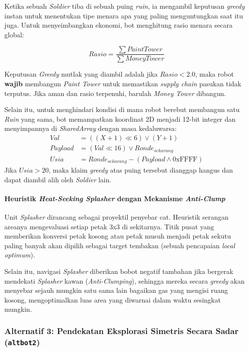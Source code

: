 Ketika sebuah \textit{Soldier} tiba di sebuah puing \textit{ruin}, ia mengambil keputusan \textit{greedy} instan untuk menentukan tipe menara apa yang paling menguntungkan saat itu juga. Untuk menyeimbangkan ekonomi, bot menghitung rasio menara secara global:

\begin{equation}
    Rasio = \frac{\sum PaintTower}{\sum MoneyTower}
\end{equation}

Keputusan \textit{Greedy} mutlak yang diambil adalah jika $Rasio < 2.0$, maka robot \textbf{wajib} membangun \textit{Paint Tower} untuk memastikan \textit{supply chain} pasukan tidak terputus. Jika aman dan rasio terpenuhi, barulah \textit{Money Tower} dibangun.

Selain itu, untuk menghindari kondisi di mana robot berebut membangun satu \textit{Ruin} yang sama, bot memampatkan koordinat 2D menjadi 12-bit integer dan menyimpannya di \textit{SharedArray} dengan masa kedaluwarsa:
\begin{align}
    Val &= ((X + 1) \ll 6) \lor (Y + 1) \\
    Payload &= (Val \ll 16) \lor Ronde_{sekarang} \\
    Usia &= Ronde_{sekarang} - (Payload \land \text{0xFFFF})
\end{align}
Jika $Usia > 20$, maka klaim \textit{greedy} atas puing tersebut dianggap hangus dan dapat diambil alih oleh \textit{Soldier} lain.

\paragraph{Heuristik \textit{Heat-Seeking Splasher} dengan Mekanisme \textit{Anti-Clump}}

Unit \textit{Splasher} dirancang sebagai proyektil penyebar cat. Heuristik serangan areanya mengevaluasi setiap petak 3x3 di sekitarnya. Titik pusat yang memberikan konversi petak kosong atau petak musuh menjadi petak sekutu paling banyak akan dipilih sebagai target tembakan (sebuah pencapaian \textit{local optimum}).

Selain itu, navigasi \textit{Splasher} diberikan bobot negatif tambahan jika bergerak mendekati \textit{Splasher} kawan (\textit{Anti-Clumping}), sehingga mereka secara \textit{greedy} akan menyebar sejauh mungkin satu sama lain bagaikan gas yang mengisi ruang kosong, mengoptimalkan luas area yang diwarnai dalam waktu sesingkat mungkin.

\subsubsection{Alternatif 3: Pendekatan Eksplorasi Simetris Secara Sadar (\texttt{altbot2})}


